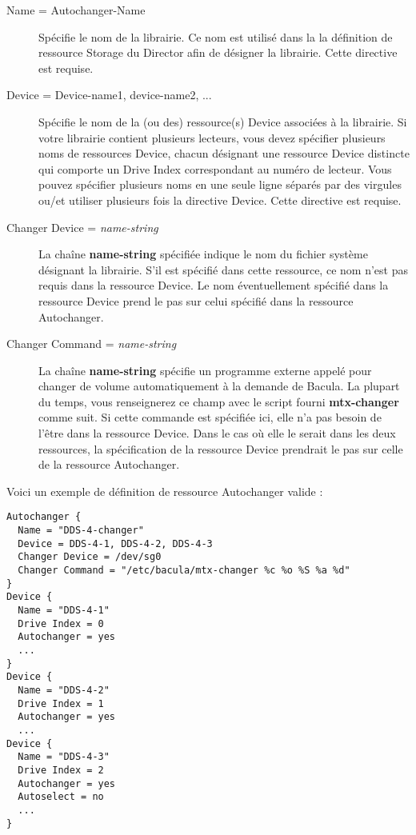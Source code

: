 \begin{description}
\item [Name = \lt{}Autochanger-Name\gt{}]
   Sp\'ecifie le nom de la librairie. Ce nom est utilis\'e dans la 
   la d\'efinition de ressource Storage du Director afin de d\'esigner 
   la librairie. Cette directive est requise.

\item [Device = \lt{}Device-name1, device-name2, ...\gt{}]
   Sp\'ecifie le nom de la (ou des) ressource(s) Device associ\'ees \`a la 
   librairie. Si votre librairie contient plusieurs lecteurs, vous 
   devez sp\'ecifier plusieurs noms de ressources Device, chacun d\'esignant 
   une ressource Device distincte qui comporte un  
   Drive Index correspondant au num\'ero de lecteur. Vous pouvez sp\'ecifier 
   plusieurs noms en une seule ligne s\'epar\'es par des virgules ou/et utiliser 
   plusieurs fois la directive Device. Cette directive est requise.

\item [Changer Device = {\it name-string}]
   La cha\^ine {\bf name-string} sp\'ecifi\'ee indique le nom du fichier syst\`eme 
   d\'esignant la librairie. S'il est sp\'ecifi\'e dans cette ressource, ce nom 
   n'est pas requis dans la ressource Device. Le nom \'eventuellement sp\'ecifi\'e 
   dans la ressource Device prend le pas sur celui sp\'ecifi\'e dans la ressource 
   Autochanger.
   
\item [Changer Command = {\it name-string}]
   La cha\^ine {\bf name-string} sp\'ecifie un programme externe appel\'e pour 
   changer de volume automatiquement \`a la demande de Bacula. La plupart du 
   temps, vous renseignerez ce champ avec le script fourni {\bf mtx-changer} 
   comme suit. Si cette commande est sp\'ecifi\'ee ici, elle n'a pas besoin de 
   l'\^etre dans la ressource Device. Dans le cas o\`u elle le serait dans les deux 
   ressources, la sp\'ecification de la ressource Device prendrait le pas sur celle 
   de la ressource Autochanger.

\end{description}

Voici un exemple de d\'efinition de ressource Autochanger valide :

\footnotesize
\begin{verbatim}
Autochanger {
  Name = "DDS-4-changer"
  Device = DDS-4-1, DDS-4-2, DDS-4-3
  Changer Device = /dev/sg0
  Changer Command = "/etc/bacula/mtx-changer %c %o %S %a %d"
}
Device {
  Name = "DDS-4-1"
  Drive Index = 0
  Autochanger = yes
  ...
}
Device {
  Name = "DDS-4-2"
  Drive Index = 1
  Autochanger = yes
  ...
Device {
  Name = "DDS-4-3"
  Drive Index = 2
  Autochanger = yes
  Autoselect = no
  ...
}
\end{verbatim}
\normalsize

